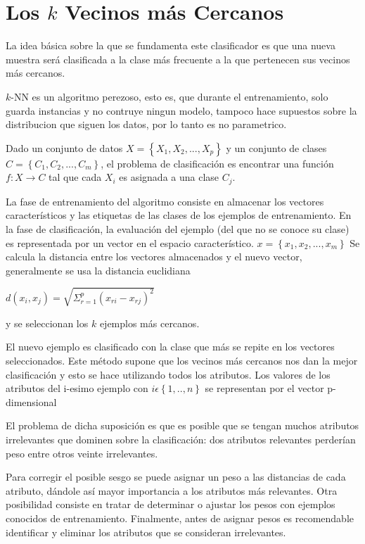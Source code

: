 \documentclass[11pt,letterpaper,reqno]{article}
\begin{document}
\section{Los $k$ Vecinos más Cercanos}

La idea básica sobre la que se fundamenta este clasificador es que una nueva muestra será clasificada a la clase más frecuente a la que pertenecen sus vecinos más cercanos.

$k$-NN es un algoritmo perezoso, esto es, que durante el entrenamiento, solo guarda instancias y no contruye ningun modelo, tampoco hace supuestos sobre la distribucion que siguen los datos, por lo tanto es no parametrico.

Dado un conjunto de datos $ X= \left\lbrace X_1,X_2, ... , X_p \right\rbrace $ y un conjunto de clases $ C= \left\lbrace C_1,C_2, ... , C_m \right\rbrace $, el  problema de clasificación es encontrar una función $ f:X \longrightarrow C $ tal que cada $ X_i $ es asignada a una clase $ C_j $.

La fase de entrenamiento del algoritmo consiste en almacenar los vectores característicos y las etiquetas de las clases de los ejemplos de entrenamiento.  En la fase de clasificación, la evaluación del ejemplo (del que no se conoce su clase) es representada por un vector en el espacio característico.
$ x = \left\lbrace x_1,x_2, ... , x_m \right\rbrace $
Se calcula la distancia entre los vectores almacenados y el nuevo vector, generalmente se usa la distancia euclidiana

\begin{center}
$ d(x_i,x_j)=\sqrt{\Sigma_{r=1}^{p} (x_{ri}-x_{rj})^2} $
\end{center}
y se seleccionan los $ k $ ejemplos más cercanos.

El nuevo ejemplo es clasificado con la clase que más se repite en los vectores seleccionados. Este método supone que los vecinos más cercanos nos dan la mejor clasificación y esto se hace utilizando todos los atributos. Los valores de los atributos del i-esimo ejemplo con $ i \epsilon \left\lbrace 1, .. , n \right\rbrace $ se representan por el vector p-dimensional

El problema de dicha suposición es que es posible que se tengan muchos atributos irrelevantes que dominen sobre la clasificación: dos atributos relevantes perderían peso entre otros veinte irrelevantes.

Para corregir el posible sesgo se puede asignar un peso a las distancias de cada atributo, dándole así mayor importancia a los atributos más relevantes. Otra posibilidad consiste en tratar de determinar o ajustar los pesos con ejemplos conocidos de entrenamiento. Finalmente, antes de asignar pesos es recomendable identificar y eliminar los atributos que se consideran irrelevantes.
\end{document}
